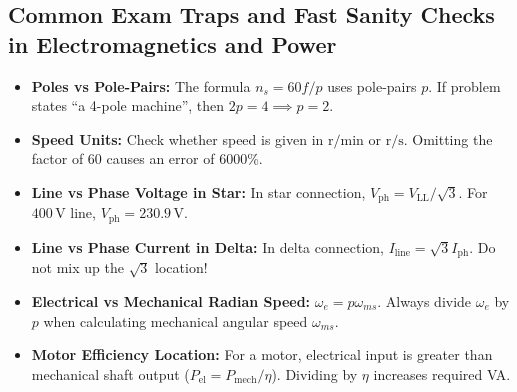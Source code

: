 \subsection{Common Exam Traps and Fast Sanity Checks in Electromagnetics and Power}
\begin{itemize}
  \item \textbf{Poles vs Pole-Pairs:} The formula $n_s = 60f/p$ uses pole-pairs $p$. If problem states ``a 4-pole machine'', then $2p = 4 \implies p = 2$.
  \item \textbf{Speed Units:} Check whether speed is given in $\mathrm{r/min}$ or $\mathrm{r/s}$. Omitting the factor of 60 causes an error of 6000\%.
  \item \textbf{Line vs Phase Voltage in Star:} In star connection, $V_{\mathrm{ph}} = V_{\mathrm{LL}}/\sqrt{3}$. For $400\,\mathrm{V}$ line, $V_{\mathrm{ph}} = 230.9\,\mathrm{V}$.
  \item \textbf{Line vs Phase Current in Delta:} In delta connection, $I_{\mathrm{line}} = \sqrt{3} I_{\mathrm{ph}}$. Do not mix up the $\sqrt{3}$ location!
  \item \textbf{Electrical vs Mechanical Radian Speed:} $\omega_e = p \omega_{ms}$. Always divide $\omega_e$ by $p$ when calculating mechanical angular speed $\omega_{ms}$.
  \item \textbf{Motor Efficiency Location:} For a motor, electrical input is greater than mechanical shaft output ($P_{\mathrm{el}} = P_{\mathrm{mech}}/\eta$). Dividing by $\eta$ increases required VA.
\end{itemize}
